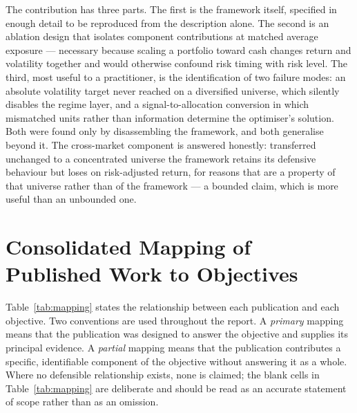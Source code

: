 The contribution has three parts. The first is the framework itself, specified in enough
detail to be reproduced from the description alone. The second is an ablation design that
isolates component contributions at matched average exposure --- necessary because scaling
a portfolio toward cash changes return and volatility together and would otherwise confound
risk timing with risk level. The third, most useful to a practitioner, is the
identification of two failure modes: an absolute volatility target never reached on a
diversified universe, which silently disables the regime layer, and a signal-to-allocation
conversion in which mismatched units rather than information determine the optimiser's
solution. Both were found only by disassembling the framework, and both generalise beyond
it. The cross-market component is answered honestly: transferred unchanged to a
concentrated universe the framework retains its defensive behaviour but loses on
risk-adjusted return, for reasons that are a property of that universe rather than of the
framework --- a bounded claim, which is more useful than an unbounded one.

\section{Consolidated Mapping of Published Work to Objectives}

Table~\ref{tab:mapping} states the relationship between each publication and each
objective. Two conventions are used throughout the report. A \emph{primary} mapping means
that the publication was designed to answer the objective and supplies its principal
evidence. A \emph{partial} mapping means that the publication contributes a specific,
identifiable component of the objective without answering it as a whole. Where no
defensible relationship exists, none is claimed; the blank cells in
Table~\ref{tab:mapping} are deliberate and should be read as an accurate statement of
scope rather than as an omission.

